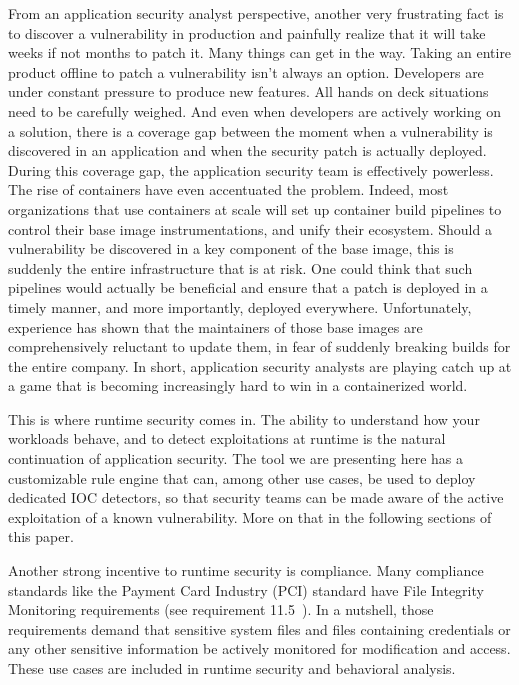 From an application security analyst perspective, another very frustrating fact is to discover a vulnerability in production and painfully realize that it will take weeks if not months to patch it.
Many things can get in the way.
Taking an entire product offline to patch a vulnerability isn’t always an option.
Developers are under constant pressure to produce new features.
All hands on deck situations need to be carefully weighed.
And even when developers are actively working on a solution, there is a coverage gap between the moment when a vulnerability is discovered in an application and when the security patch is actually deployed.
During this coverage gap, the application security team is effectively powerless.
The rise of containers have even accentuated the problem.
Indeed, most organizations that use containers at scale will set up container build pipelines to control their base image instrumentations, and unify their ecosystem.
Should a vulnerability be discovered in a key component of the base image, this is suddenly the entire infrastructure that is at risk.
One could think that such pipelines would actually be beneficial and ensure that a patch is deployed in a timely manner, and more importantly, deployed everywhere.
Unfortunately, experience has shown that the maintainers of those base images are comprehensively reluctant to update them, in fear of suddenly breaking builds for the entire company.
In short, application security analysts are playing catch up at a game that is becoming increasingly hard to win in a containerized world.

This is where runtime security comes in.
The ability to understand how your workloads behave, and to detect exploitations at runtime is the natural continuation of application security.
The tool we are presenting here has a customizable rule engine that can, among other use cases, be used to deploy dedicated IOC detectors, so that security teams can be made aware of the active exploitation of a known vulnerability.
More on that in the following sections of this paper.

Another strong incentive to runtime security is compliance.
Many compliance standards like the Payment Card Industry (PCI) standard have File Integrity Monitoring requirements (see requirement 11.5~\cite{RuntimeSecurityMonitoringWithEBPF:PCI}).
In a nutshell, those requirements demand that sensitive system files and files containing credentials or any other sensitive information be actively monitored for modification and access.
These use cases are included in runtime security and behavioral analysis.


